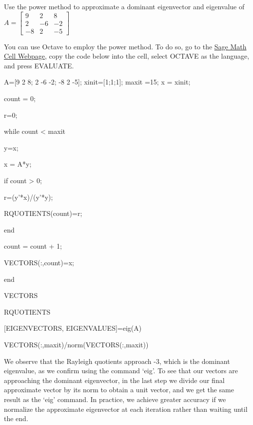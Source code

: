 \documentclass{ximera}
\begin{document}

\begin{exploration}\label{exp:3x3PowerMethod}
Use the power method to approximate a dominant eigenvector and eigenvalue of $A = \left[ \begin{array}{rrr}
9 & 2 & 8 \\
2 & -6 & -2 \\
-8 & 2 & -5
\end{array}\right]$

You can use Octave to employ the power method.  To do so, go to the \href{https://sagecell.sagemath.org/}{Sage Math Cell Webpage}, copy the code below into the cell, select OCTAVE as the language, and press EVALUATE.

A=[9 2 8; 2 -6 -2; -8 2 -5]; %
xinit=[1;1;1];
maxit =15;
x = xinit;

count = 0;

r=0;

    while count < maxit
    
    y=x;
    
    x = A*y;
    
        if count > 0; 
        
        r=(y'*x)/(y'*y);
        
        RQUOTIENTS(count)=r;
        
        end
        
    count = count + 1;
    
    VECTORS(:,count)=x;
    
end

VECTORS

RQUOTIENTS

[EIGENVECTORS, EIGENVALUES]=eig(A)

VECTORS(:,maxit)/norm(VECTORS(:,maxit))


We observe that the Rayleigh quotients approach -3, which is the dominant eigenvalue, as we confirm using the command `eig'.  To see that our vectors are approaching the dominant eigenvector, in the last step we divide our final approximate vector by its norm to obtain a unit vector, and we get the same result as the `eig' command.  In practice, we achieve greater accuracy if we normalize the approximate eigenvector at each iteration rather than waiting until the end.


\end{exploration}
\end{document}
